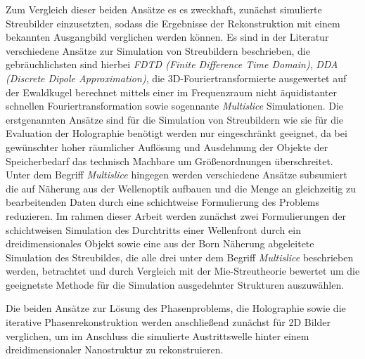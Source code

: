 Zum Vergleich dieser beiden  Ansätze es es zweckhaft, zunächst simulierte Streubilder einzusetzten, sodass die Ergebnisse der Rekonstruktion mit einem bekannten Ausgangbild verglichen werden können. Es sind in der Literatur verschiedene Ansätze zur Simulation von Streubildern beschrieben, die gebräuchlichsten sind hierbei  \textit{FDTD (Finite Difference Time Domain)}, \textit{DDA (Discrete Dipole Approximation)}, die 3D-Fouriertransformierte ausgewertet auf der Ewaldkugel berechnet mittels einer im Frequenzraum nicht äquidistanter schnellen Fouriertransformation sowie sogennante \textit{Multislice} Simulationen. Die erstgenannten Ansätze sind für die Simulation von Streubildern wie sie für die Evaluation der Holographie benötigt werden nur eingeschränkt geeignet, da bei gewünschter hoher räumlicher Auflösung und Ausdehnung der Objekte der Speicherbedarf das technisch Machbare um Größenordnungen überschreitet. Unter dem Begriff \textit{Multislice} hingegen werden verschiedene Ansätze subsumiert die auf Näherung aus der Wellenoptik aufbauen und die Menge an gleichzeitig zu bearbeitenden Daten durch eine schichtweise Formulierung des Problems reduzieren. Im rahmen dieser Arbeit werden zunächst zwei Formulierungen der schichtweisen Simulation des Durchtritts einer Wellenfront durch ein dreidimensionales Objekt sowie eine aus der Born Näherung abgeleitete Simulation des Streubildes, die alle drei unter dem Begriff \textit{Multislice} beschrieben werden, betrachtet und durch Vergleich mit der Mie-Streutheorie bewertet um die geeignetste Methode für die Simulation ausgedehnter Strukturen auszuwählen.

Die beiden Ansätze zur Lösung des Phasenproblems, die Holographie sowie die iterative Phasenrekonstruktion werden anschließend zunächst für 2D Bilder verglichen, um im Anschluss die simulierte Austrittswelle hinter einem dreidimensionaler Nanostruktur zu rekonstruieren.

